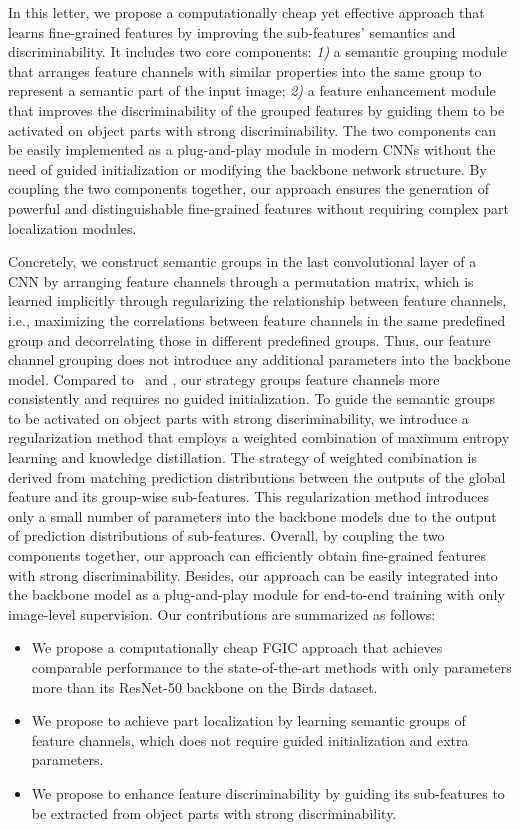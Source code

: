 \documentclass[journal]{IEEEtran}
\begin{document}
In this letter, we propose a computationally cheap yet effective approach that learns fine-grained features by improving the sub-features' semantics and discriminability.
It includes two core components: 
{\it 1)} a semantic grouping module that arranges feature channels with similar properties into the same group to represent a semantic part of the input image; 
{\it 2)} a feature enhancement module that improves the discriminability of the grouped features by guiding them to be activated on object parts with strong discriminability. 
The two components can be easily implemented as a plug-and-play module in modern CNNs without the need of guided initialization or modifying the backbone network structure. 
By coupling the two components together, our approach ensures the generation of powerful and distinguishable fine-grained features without requiring complex part localization modules.


Concretely, we construct semantic groups in the last convolutional layer of a CNN by arranging feature channels through a permutation matrix,       
which is learned implicitly through regularizing the relationship between feature channels, i.e., maximizing the correlations between feature channels in the same predefined group and decorrelating those in different predefined groups. Thus, our feature channel grouping does not introduce any additional parameters into the backbone model.
Compared to~\cite{trilinear_attention@luojiebo} and \cite{macnn@mei}, our strategy groups feature channels more consistently and requires no guided initialization.
To guide the semantic groups to be activated on object parts with strong discriminability, we introduce a regularization method that employs a weighted combination of maximum entropy learning and knowledge distillation. 
The strategy of weighted combination is derived from matching prediction distributions between the outputs of the global feature and its group-wise sub-features. 
This regularization method introduces only a small number of parameters into the backbone models due to the output of prediction distributions of sub-features.
Overall, by coupling the two components together, our approach can efficiently obtain fine-grained features with strong discriminability. 
Besides, our approach can be easily integrated into the backbone model as a plug-and-play module for end-to-end training with only image-level supervision. 
Our contributions are summarized as follows:
\begin{itemize}
    \item[] We propose a computationally cheap FGIC approach that achieves comparable performance to the state-of-the-art methods with only  parameters more than its ResNet-50 backbone on the Birds dataset.
\item[] We propose to achieve part localization by learning semantic groups of feature channels, which does not require guided initialization and extra parameters.
    \item[] We propose to enhance feature discriminability by guiding its sub-features to be extracted from object parts with strong discriminability.
\end{itemize}
\end{document}
